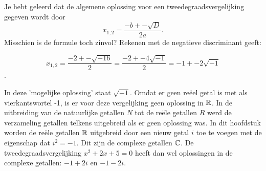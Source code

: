 \documentclass{ximera}
\begin{document}
    
    





Je hebt geleerd dat de algemene oplossing voor een tweedegraadsvergelijking gegeven wordt door 
\[  
    x_{1,2} = \frac{-b +- \sqrt{D}}{2a}. 
\]
Misschien is de formule toch zinvol? Rekenen met de negatieve discriminant geeft:

\[ x_{1,2} = \frac{-2 +- \sqrt{-16}}{2} = \frac{-2 +- 4\sqrt{-1}}{2} = -1 +- 2\sqrt{-1}\]. 

In deze 'mogelijke oplossing' staat \(\sqrt{-1}\). Omdat er geen reëel getal is met als vierkantswortel -1, is er voor deze vergelijking geen oplossing in \(\mathbb{R}\). In de uitbreiding van de natuurlijke getallen \(N\) tot de reële getallen \(R\) werd de verzameling getallen telkens uitgebreid als er geen oplossing was. In dit hoofdstuk worden de reële getallen \(\mathbb{R}\) uitgebreid door een nieuw getal \(i\) toe te voegen met de eigenschap dat \(i^2 = -1\). Dit zijn de complexe getallen \(\mathbb{C}\). De tweedegraadsvergelijking \(x^2 + 2x + 5 = 0\) heeft dan wel oplossingen in de complexe getallen: \(-1 + 2i\)  en  \(-1-2i\).
\end{document}
